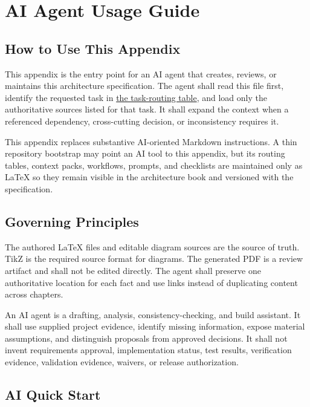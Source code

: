 \chapter{AI Agent Usage Guide}

\section{How to Use This Appendix}
This appendix is the entry point for an AI agent that creates, reviews, or
maintains this architecture specification. The agent shall read this file
first, identify the requested task in
\hyperref[Table:AITaskRouting]{the task-routing table}, and load only the
authoritative sources listed for that task. It shall expand the context when a
referenced dependency, cross-cutting decision, or inconsistency requires it.

This appendix replaces substantive AI-oriented Markdown instructions. A thin
repository bootstrap may point an AI tool to this appendix, but its routing
tables, context packs, workflows, prompts, and checklists are maintained only
as LaTeX so they remain visible in the architecture book and versioned with the
specification.

\section{Governing Principles}
The authored LaTeX files and editable diagram sources are the source of truth.
TikZ is the required source format for diagrams.
The generated PDF is a review artifact and shall not be edited directly. The
agent shall preserve one authoritative location for each fact and use links
instead of duplicating content across chapters.

An AI agent is a drafting, analysis, consistency-checking, and build assistant.
It shall use supplied project evidence, identify missing information, expose
material assumptions, and distinguish proposals from approved decisions. It
shall not invent requirements approval, implementation status, test results,
verification evidence, validation evidence, waivers, or release authorization.

\section{AI Quick Start}
\label{Section:AIQuickStart}

